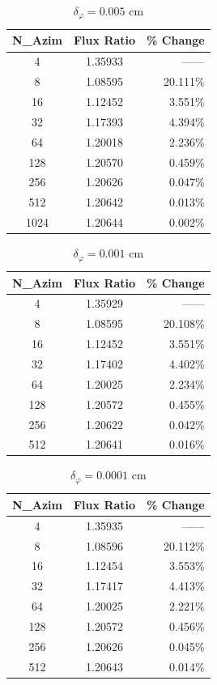 \documentclass[12pt]{article}
\begin{document}
\begin{table}[H]
\centering
\caption{$\delta_\varphi = 0.005$ cm}
\label{tab:dazim0050}
\begin{tabular}{c|c|r}
\hline
N\_Azim & Flux Ratio & \% Change \\
 \hline \hline
4	&	1.35933	&	------ \hspace{6pt}	\\
8	&	1.08595	&	20.111\%	\\
16	&	1.12452	&	3.551\%	\\
32	&	1.17393	&	4.394\%	\\
64	&	1.20018	&	2.236\%	\\
128	&	1.20570	&	0.459\%	\\
256	&	1.20626	&	0.047\%	\\
512	&	1.20642	&	0.013\%	\\
1024	&	1.20644	&	0.002\%	
\end{tabular}
\end{table}


\begin{table}[H]
\centering
\caption{$\delta_\varphi = 0.001$ cm}
\label{tab:dazim0010}
\begin{tabular}{c|c|r}
\hline
N\_Azim & Flux Ratio & \% Change \\
 \hline \hline
4	&	1.35929	&	------ \hspace{6pt}	\\
8	&	1.08595	&	20.108\%	\\
16	&	1.12452	&	3.551\%	\\
32	&	1.17402	&	4.402\%	\\
64	&	1.20025	&	2.234\%	\\
128	&	1.20572	&	0.455\%	\\
256	&	1.20622	&	0.042\%	\\
512	&	1.20641	&	0.016\% 
\end{tabular}
\end{table}

\begin{table}[H]
\centering
\caption{$\delta_\varphi = 0.0001$ cm}
\label{tab:dazim0001}
\begin{tabular}{c|c|r}
\hline
N\_Azim & Flux Ratio & \% Change \\
 \hline \hline
4	&	1.35935	&	------ \hspace{6pt}	\\
8	&	1.08596	&	20.112\%  \\
16	&	1.12454	&	3.553\%	  \\
32	&	1.17417	&	4.413\%	  \\
64	&	1.20025	&	2.221\%	  \\
128	&	1.20572	&	0.456\%	  \\
256	&	1.20626	&	0.045\%	  \\
512	&	1.20643	&	0.014\%	
\end{tabular}
\end{table}
\end{document}
